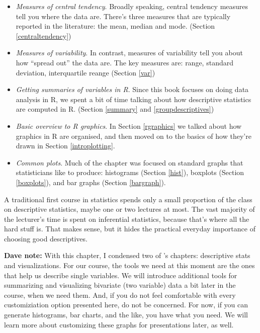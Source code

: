 \documentclass[
]{book}
\providecommand{\tightlist}{%
  \setlength{\itemsep}{0pt}\setlength{\parskip}{0pt}}
\begin{document}
\begin{itemize}
\tightlist
\item
  \emph{Measures of central tendency}. Broadly speaking, central tendency measures tell you where the data are. There's three measures that are typically reported in the literature: the mean, median and mode. (Section \ref{centraltendency})
\item
  \emph{Measures of variability}. In contrast, measures of variability tell you about how ``spread out'' the data are. The key measures are: range, standard deviation, interquartile reange (Section \ref{var})
\item
  \emph{Getting summaries of variables in R}. Since this book focuses on doing data analysis in R, we spent a bit of time talking about how descriptive statistics are computed in R. (Section \ref{summary} and \ref{groupdescriptives})
\item
  \emph{Basic overview to R graphics}. In Section \ref{rgraphics} we talked about how graphics in R are organised, and then moved on to the basics of how they're drawn in Section \ref{introplotting}.
\item
  \emph{Common plots}. Much of the chapter was focused on standard graphs that statisticians like to produce: histograms (Section \ref{hist}), boxplots (Section \ref{boxplots}), and bar graphs (Section \ref{bargraph}).
\end{itemize}

A traditional first course in statistics spends only a small proportion of the class on descriptive statistics, maybe one or two lectures at most. The vast majority of the lecturer's time is spent on inferential statistics, because that's where all the hard stuff is. That makes sense, but it hides the practical everyday importance of choosing good descriptives.

\textbf{Dave note:} With this chapter, I condensed two of \citet{Navarro2018}'s chapters: descriptive stats and visualizations. For our course, the tools we need at this moment are the ones that help us describe single variables. We will introduce additional tools for summarizing and visualizing bivariate (two variable) data a bit later in the course, when we need them. And, if you do not feel comfortable with every customiziation option presented here, do not be concerned. For now, if you can generate histograms, bar charts, and the like, you have what you need. We will learn more about customizing these graphs for presentations later, as well.

  
\end{document}
